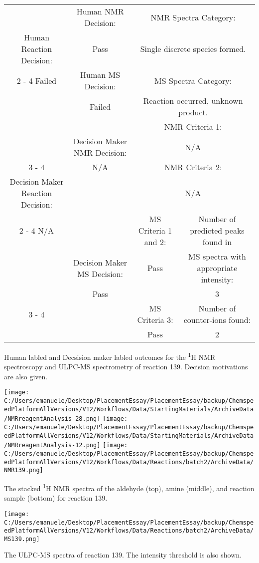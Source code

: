 \documentclass{article}%
\begin{document}
\begin{Decision Table}[H]%
\begin{tabular}{|c|c|c|c|}%
\hline%
&Human NMR Decision:&\multicolumn{2}{|c|}{NMR Spectra Category:}\\%
Human Reaction Decision:&Pass&\multicolumn{2}{|c|}{Single discrete species formed.}\\%
\cline{2%
-%
4}%
Failed&Human MS Decision:&\multicolumn{2}{|c|}{MS Spectra Category:}\\%
&Failed&\multicolumn{2}{|c|}{Reaction occurred, unknown product.}\\%
\hline%
&&\multicolumn{2}{|c|}{NMR Criteria 1:}\\%
&Decision Maker NMR Decision:&\multicolumn{2}{|c|}{N/A}\\%
\cline{3%
-%
4}%
&N/A&\multicolumn{2}{|c|}{NMR Criteria 2:}\\%
Decision Maker Reaction Decision:&&\multicolumn{2}{|c|}{N/A}\\%
\cline{2%
-%
4}%
N/A&&MS Criteria 1 and 2:&Number of predicted peaks found in\\%
&Decision Maker MS Decision:&Pass&MS spectra with appropriate intensity:\\%
&Pass&&3\\%
\cline{3%
-%
4}%
&&MS Criteria 3:&Number of counter{-}ions found:\\%
&&Pass&2\\%
\hline%
\end{tabular}%
\caption{Human labled and Decsision maker labled outcomes for the \textsuperscript{1}H NMR spectroscopy and ULPC-MS spectrometry of reaction 139. Decision motivations are also given.}%
\end{Decision Table}%
\begin{NMR Spectra}[H]%
\begin{center}%
\texttt{[image: C:/Users/emanuele/Desktop/PlacementEssay/PlacementEssay/backup/ChemspeedPlatformAllVersions/V12/Workflows/Data/StartingMaterials/ArchiveData/NMRreagentAnalysis-28.png]}\hfill%
\texttt{[image: C:/Users/emanuele/Desktop/PlacementEssay/PlacementEssay/backup/ChemspeedPlatformAllVersions/V12/Workflows/Data/StartingMaterials/ArchiveData/NMRreagentAnalysis-12.png]}\hfill%
\texttt{[image: C:/Users/emanuele/Desktop/PlacementEssay/PlacementEssay/backup/ChemspeedPlatformAllVersions/V12/Workflows/Data/Reactions/batch2/ArchiveData/NMR139.png]}\hfill%
\end{center}%
\caption{The stacked \textsuperscript{1}H NMR spectra of the aldehyde (top), amine (middle), and reaction sample (bottom) for reaction 139.}%
\end{NMR Spectra}%
\begin{MS Spectra}[H]%
\begin{center}%
\texttt{[image: C:/Users/emanuele/Desktop/PlacementEssay/PlacementEssay/backup/ChemspeedPlatformAllVersions/V12/Workflows/Data/Reactions/batch2/ArchiveData/MS139.png]}\hfill%
\end{center}%
\caption{The ULPC-MS spectra of reaction 139. The intensity threshold is also shown.}%
\end{MS Spectra}%
\end{document}
